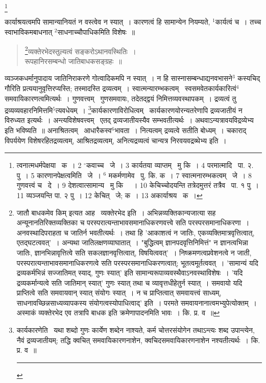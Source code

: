 \documentclass[11pt, openany]{book}
\newcommand\blfootnote[1]{%
 \begingroup
 \renewcommand\thefootnote{}\footnote{#1}%
 \addtocounter{footnote}{-1}%
 \endgroup
}
\begin{document}
\blfootnote{त्वनात्मधर्मपेक्षया  \textendash\ क~। 2 ${}^\circ$कवाच्च  \textendash\ जे~। 3 कार्यतया व्याप्तम्  \textendash\ मु कि~। 4 परमात्मादि \textendash\ पा. २. पु~। 5 कारणानपेक्षत्वमिति  \textendash\ जे~। ${}^6$ मकर्मणामेव \textendash\ पु. कि. क~। 7 स्वात्मनारम्भकत्वम्  \textendash\ जे~। 8 गुणवत्त्वं च  \textendash\ दे~। 9 देशत्वात्सामान्य  \textendash\ मु कि  \textendash\ ~। 10 केचिच्चोदयन्ति तत्रेदमुत्तरं तत्रैव  \textendash\ पा. १ पु~। 11 व्यञ्जयन्ति पा. २ पु~। 12 केचित्  \textendash\ जे; क~। 13 अकार्याश्रय  \textendash\ क~।}

\newpage
\noindent
कार्याश्रयत्वमपि सामान्यानियतं न वस्त्वेव न स्यात्~। कारणत्वं हि सामान्येन नियम्यते, ${}^1$कार्यत्वं च~। तच्च स्वाभाविकमबाधनात् ${}^2$साधनाच्चौपाधिकमिति विशेषः~॥

\begin{quote}
{\qt \renewcommand{\thefootnote}{१}\footnote{जातौ बाधकमेव किम् इत्यत आह \textendash\ व्यक्तेरभेद इति~। अभिन्नव्यक्तिकान्यजात्या सह अन्यूनानतिरिक्तव्यक्तिका च परस्परात्यन्ताभावसमानाधिकरणवत्त्वे सति परस्परसमानाधिकरणा~। अनवस्थादिपराहता च जातिर्न भवतीत्यर्थः~। तथा हि 'आकाशत्वं न जातिः, एकव्यक्तिमात्रवृत्तित्वात्, एतद्घटत्ववत्'~। अन्यथा जातिलक्षणव्याघातात्~। "बुद्धित्वम् ज्ञानपदवृत्तिनिमित्तं" न ज्ञानत्वभिन्ना जातिः, ज्ञानभिन्नावृत्तित्वे सति सकलज्ञानवृत्तित्वात्, विषयित्ववत्'~। निष्क्रमणत्वप्रवेशनत्वे न जाती, परस्परात्यन्ताभावसमानाधिकरणत्वे सति परस्परसमानाधिकरणत्वात्; भूतत्वमूर्तत्ववत्~। 'सामान्यं यदि द्रव्यकर्मभिन्नं सज्जातिमत् स्याद्, गुणः स्यात्' इति सामान्यरूपाव्यवस्थैवाऽनवस्थाविशेषः~। 'यदि द्रव्यकर्मान्यत्वे सति जातिमान् स्यात्' गुणः स्यात् तथा च व्यावृत्तधीहेतुर्न स्यात्~। समवायो यदि प्राप्तित्वे सति समवायवान् स्यात् संयोगः स्यात्~। न च प्राप्तित्वात् समवायत्त्वं साध्यम्, साधनावच्छिन्नसाध्यव्यापकस्य संयोगत्वस्योपाधित्वाद्' इति~। परमते समवायनानात्वमभ्युपेत्योक्तम्~। अस्माकं व्यक्तेरभेद एव तत्रापि बाधक इति क्रमेणापादनमिति भावः~। कि. प्र. व~॥}व्यक्तेरभेदस्तुल्यत्वं सङ्करोऽथानवस्थितिः~।\\
रूपहानिरसम्बन्धो जातिबाधकसङ्ग्रहः~॥}
\end{quote}

\begin{sloppypar}
व्यञ्जकधर्मानुपादाय जातिनिराकरणे गोत्वादिकमपि न स्यात्~। न हि सास्नासम्बन्धाद्यनवभासने$^3$ कस्यचिद् गौरिति प्रत्ययानुवृत्तिरप्यस्ति; तस्मादस्ति द्रव्यत्वम्~। {\knu स्वात्मन्यारम्भकत्वम्} \textendash\ स्वसमवेतकार्यकारित्वं$^4$ समवायिकारणत्वमित्यर्थः~। {\knu गुणवत्त्वम्} \textendash\ गुणसमवायः, तदेतद्द्वयं निमित्तव्यवस्थापकम्~। द्रव्यत्वं तु द्रव्यव्यवहारनिमित्तमि$^5$त्यवधेयम्~। \renewcommand{\thefootnote}{२}\footnote{कार्यकारणेति \textendash\ यथा शब्दो गुणः कार्येण शब्देन नाश्यते, कर्म चोत्तरसंयोगेन तथाऽन्त्यः शब्द उपान्त्येन, नैवं द्रव्यजातीयम्; तद्धि क्वचित् समवायिकारणनाशेन, क्वचिदसमवायिकारणनाशेन नश्यतीत्यर्थः~। कि. प्र. व~॥ \rule{0.4\linewidth}{0.5pt}}कार्यकारणाविरोधित्वम् \textendash\ कार्यकारणयोरन्यतरेणापि द्रव्यजातीयं न विरुध्यत इत्यर्थः~। अन्त्यविशेषवत्त्वम् \textendash\ एतद् द्रव्यजातीयस्यैव सम्भवतीत्यर्थः~। अथवाऽन्यत्रावयविद्रव्येभ्य इति भविष्यति~॥ अनाश्रितत्वम् \textendash\ आधारैकस्व$^6$भावता~। नित्यत्वम् द्रव्यत्वे सतीति बोध्यम्~। चकाराद् विपर्ययेण विशेषरहितद्रव्यत्वम्, आश्रितद्रव्यत्वम्, अनित्यद्रव्यत्वं चान्यत्र निरवयवद्रव्थेभ्य इति~।
\end{sloppypar}
\end{document}
